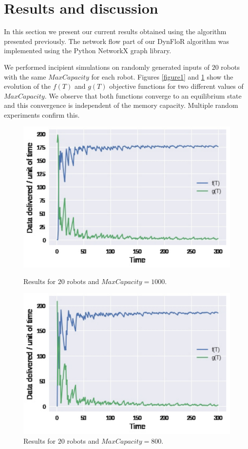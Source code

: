 \section{Results and discussion}\label{discussion}

In this section we present our current results obtained using the algorithm presented previously. The network flow part of our DynFloR algorithm was implemented using the Python NetworkX \cite{nx} graph library.

We performed incipient simulations on randomly generated inputs of $20$ robots with the same $MaxCapacity$ for each robot. Figures \ref{figure1} and \ref{figure2} show the evolution of the $f(T)$ and $g(T)$ objective functions for two different values of $MaxCapacity$. We observe that both functions converge to an equilibrium state and this convergence is independent of the memory capacity. Multiple random experiments confirm this.

\begin{figure}[!htb]
\begin{minipage}{0.5\linewidth}
\centering
  \includegraphics[scale=0.6]{Figures/graf1.pdf}
  \caption{Results for $20$ robots and $MaxCapacity=1000$. }
  \label{figure1}
\end{minipage}
\hfill
\begin{minipage}{0.5\linewidth}
\centering
  \includegraphics[scale=0.6]{Figures/graf2.pdf}
  \caption{Results for $20$ robots and $MaxCapacity=800$.}
  \label{figure2}
\end{minipage}
\end{figure}


